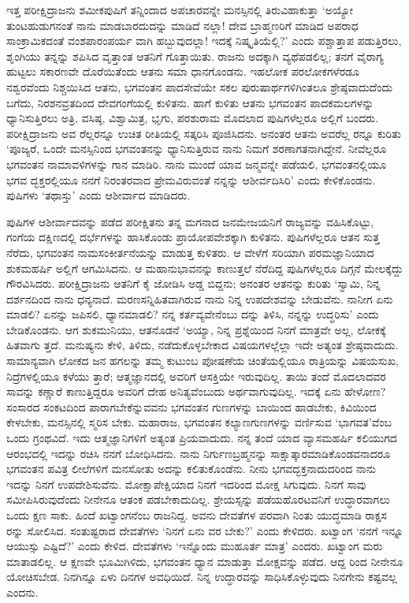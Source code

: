ಇತ್ತ ಪರೀಕ್ಷಿದ್ರಾಜನು ಶಮೀಕಪುಷಿಗೆ ತನ್ನಿಂದಾದ ಅಪಚಾರವನ್ನೇ ಮನಸ್ಸಿನಲ್ಲಿ ತಿರುವಿಹಾಕುತ್ತಾ ‘ಅಯ್ಯೋ ತುಂಟಹುಡುಗನಂತೆ ನಾನು ಮಾಡಬಾರದುದನ್ನು ಮಾಡಿದೆ ನಲ್ಲಾ! ದೇವ ಬ್ರಾಹ್ಮಣರಿಗೆ ಮಾಡಿದ ಅಪರಾಧ ಸಾಂಕ್ರಾಮಿಕದಂತೆ ವಂಶಪಾರಂಪರ್ಯ ವಾಗಿ ಹಬ್ಬುವುದಲ್ಲಾ! ಇದಕ್ಕೆ ನಿಷ್ಕೃತಿಯೆಲ್ಲಿ?’ ಎಂದು ಪಶ್ಚಾತ್ತಾಪ ಪಡುತ್ತಿರಲು, ಶೃಂಗಿಯು ತನ್ನನ್ನು ಶಪಿಸಿದ ವೃತ್ತಾಂತ ಆತನಿಗೆ ಗೊತ್ತಾಯಿತು. ರಾಜನು ಅದಕ್ಕಾಗಿ ವ್ಯಥೆಪಡಲಿಲ್ಲ; ತನಗೆ ವೈರಾಗ್ಯ ಹುಟ್ಟಲು ಸಕಾರಣವೇ ದೊರೆಯಿತೆಂದು ಆತನು ಸಮಾ ಧಾನಗೊಂಡನು. ಇಹಲೋಕ ಪರಲೋಕಗಳೆರಡೂ ನಶ್ವರವೆಂದು ನಿಶ್ಚಯಿಸಿದ ಆತನು, ಭಗವಂತನ ಪಾದಸೇವೆಯೇ ಸಕಲ ಪುರುಷಾರ್ಥಗಳಿಗಿಂತಲೂ ಶ್ರೇಷ್ಠವಾದುದೆಂದು ಬಗೆದು, ನಿರಶನವ್ರತದಿಂದ ದೇವಗಂಗೆಯಲ್ಲಿ ಕುಳಿತನು. ಹಾಗೆ ಕುಳಿತು ಆತನು ಭಗವಂತನ ಪಾದಕಮಲಗಳನ್ನು ಧ್ಯಾನಿಸುತ್ತಿರಲು ಅತ್ರಿ, ವಸಿಷ್ಠ, ವಿಶ್ವಾಮಿತ್ರ, ಭೃಗು, ಪರಶುರಾಮ ಮೊದಲಾದ ಪುಷಿಗಳೆಲ್ಲರೂ ಅಲ್ಲಿಗೆ ಬಂದರು. ಪರೀಕ್ಷಿದ್ರಾಜನು ಅವ ರೆಲ್ಲರನ್ನೂ ಉಚಿತ ರೀತಿಯಲ್ಲಿ ಸತ್ಕರಿಸಿ ಪೂಜಿಸಿದನು. ಅನಂತರ ಆತನು ಅವರೆಲ್ಲ ರನ್ನೂ ಕುರಿತು ‘ಪೂಜ್ಯರೆ, ಒಂದೇ ಮನಸ್ಸಿನಿಂದ ಭಗವಂತನನ್ನು ಧ್ಯಾನಿಸುತ್ತಿರುವ ನಾನು ನಿಮಗೆ ಶರಣಾಗತನಾಗಿದ್ದೇನೆ. ನೀವೆಲ್ಲರೂ ಭಗವಂತನ ನಾಮಾವಳಿಗಳನ್ನು ಗಾನ ಮಾಡಿರಿ. ನಾನು ಮುಂದೆ ಯಾವ ಜನ್ಮವನ್ನೇ ಪಡೆಯಲಿ, ಭಗವಂತನಲ್ಲಿಯೂ ಭಗವ ದ್ಭಕ್ತರಲ್ಲಿಯೂ ನನಗೆ ನಿರಂತರವಾದ ಪ್ರೇಮವಿರುವಂತೆ ನನ್ನನ್ನು ಆಶೀರ್ವದಿಸಿರಿ’ ಎಂದು ಕೇಳಿಕೊಂಡನು. ಪುಷಿಗಳು ‘ತಥಾಸ್ತು’ ಎಂದು ಆಶೀರ್ವಾದ ಮಾಡಿದರು.

ಪುಷಿಗಳ ಆಶೀರ್ವಾದವನ್ನು ಪಡೆದ ಪರೀಕ್ಷಿತನು ತನ್ನ ಮಗನಾದ ಜನಮೇಜಯನಿಗೆ ರಾಜ್ಯವನ್ನು ವಹಿಸಿಕೊಟ್ಟು, ಗಂಗೆಯ ದಕ್ಷಿಣದಲ್ಲಿ ದರ್ಭೆಗಳನ್ನು ಹಾಸಿಕೊಂಡು ಪ್ರಾಯೋಪವೇಶಕ್ಕಾಗಿ ಕುಳಿತನು. ಪುಷಿಗಳೆಲ್ಲರೂ ಆತನ ಸುತ್ತ ನೆರೆದು, ಭಗವಂತನ ನಾಮಸಂಕೀರ್ತನೆಯನ್ನು ಮಾಡುತ್ತ ಕುಳಿತರು. ಆ ವೇಳೆಗೆ ಸರಿಯಾಗಿ ಪರಮಜ್ಞಾನಿಯಾದ ಶುಕಮಹರ್ಷಿ ಅಲ್ಲಿಗೆ ಆಗಮಿಸಿದನು. ಆ ಮಹಾನುಭಾವನನ್ನು ಕಾಣುತ್ತಲೆ ನೆರೆದಿದ್ದ ಪುಷಿಗಳೆಲ್ಲರೂ ದಿಗ್ಗನೆ ಮೇಲಕ್ಕೆದ್ದು ಗೌರವಿಸಿದರು. ಪರೀಕ್ಷಿದ್ರಾಜನು ಆತನಿಗೆ ಕೈ ಜೋಡಿಸಿ ಅಡ್ಡ ಬಿದ್ದನು; ಅನಂತರ ಆತನನ್ನು ಕುರಿತು ‘ಸ್ವಾಮಿ, ನಿನ್ನ ದರ್ಶನದಿಂದ ನಾನು ಧನ್ಯನಾದೆ. ಮರಣಸನ್ನಿಹಿತವಾಗಿರುವ ನಾನು ನಿನ್ನ ಉಪದೇಶವನ್ನು ಬೇಡುವೆನು. ನಾನೀಗ ಏನು ಮಾಡಲಿ? ಏನನ್ನು ಜಪಿಸಲಿ, ಧ್ಯಾನಮಾಡಲಿ? ನನ್ನ ಕರ್ತವ್ಯವೇನೆಂಬು ದನ್ನು ತಿಳಿಸಿ, ನನ್ನನ್ನು ಉದ್ಧರಿಸು’ ಎಂದು ಬೇಡಿಕೊಂಡನು. ಆಗ ಶುಕಮುನಿಯು, ಆತನೊಡನೆ ‘ಅಯ್ಯಾ, ನಿನ್ನ ಪ್ರಶ್ನೆಯಿಂದ ನಿನಗೆ ಮಾತ್ರವೇ ಅಲ್ಲ, ಲೋಕಕ್ಕೆ ಹಿತವಾಗು ತ್ತದೆ. ಮನುಷ್ಯನು ಕೇಳಿ, ತಿಳಿದು, ನಡೆದುಕೊಳ್ಳಬೇಕಾದ ವಿಷಯಗಳಲ್ಲೆಲ್ಲಾ ಇದೇ ಅತ್ಯಂತ ಶ್ರೇಷ್ಠವಾದುದು. ಸಾಮಾನ್ಯವಾಗಿ ಲೋಕದ ಜನ ಹಗಲನ್ನು ತಮ್ಮ ಕುಟುಂಬ ಪೋಷಣೆಯ ಚಿಂತೆಯಲ್ಲಿಯೂ ರಾತ್ರಿಯನ್ನು ವಿಷಯಸುಖ, ನಿದ್ರೆಗಳಲ್ಲಿಯೂ ಕಳೆಯು ತ್ತಾರೆ; ಆತ್ಮಜ್ಞಾನದಲ್ಲಿ ಅವರಿಗೆ ಆಸಕ್ತಿಯೇ ಇರುವುದಿಲ್ಲ. ತಾಯಿ ತಂದೆ ಮೊದಲಾದವರ ಸಾವನ್ನು ಕಣ್ಣಾರೆ ಕಾಣುತ್ತಿದ್ದರೂ ಅವರಿಗೆ ದೇಹ ಅನಿತ್ಯವೆಂಬುದು ಅರ್ಥವಾಗುವುದಿಲ್ಲ. ಇದಕ್ಕೆ ಏನು ಹೇಳೋಣ? ಸಂಸಾರದ ಸಂಕಟದಿಂದ ಪಾರಾಗಬೇಕೆನ್ನುವವನು ಭಗವಂತನ ಗುಣಗಳನ್ನು ಬಾಯಿಂದ ಹಾಡಬೇಕು, ಕಿವಿಯಿಂದ ಕೇಳಬೇಕು, ಮನಸ್ಸಿನಲ್ಲಿ ಸ್ಮರಿಸ ಬೇಕು. ಮಹಾರಾಜ, ಭಗವಂತನ ಕಲ್ಯಾಣಗುಣಗಳನ್ನು ವರ್ಣಿಸುವ ‘ಭಾಗವತ’ವೆಂಬ ಒಂದು ಗ್ರಂಥವಿದೆ. ಇದು ಆತ್ಮಜ್ಞಾನಿಗಳಿಗೆ ಅತ್ಯಂತ ಪ್ರಿಯವಾದುದು. ನನ್ನ ತಂದೆ ಯಾದ ವ್ಯಾಸಮಹರ್ಷಿ ಕಲಿಯುಗದ ಆರಂಭದಲ್ಲಿ ಇದನ್ನು ರಚಿಸಿ ನನಗೆ ಬೋಧಿಸಿದನು. ನಾನು ನಿರ್ಗುಣಬ್ರಹ್ಮನನ್ನು ಸಾಕ್ಷಾತ್ಕಾರಮಾಡಿಕೊಂಡವನಾದರೂ ಭಗವಂತನ ಪವಿತ್ರ ಲೀಲೆಗಳಿಗೆ ಮನಸೋತು ಅದನ್ನು ಕಲಿತುಕೊಂಡೆನು. ನೀನು ಭಗವದ್ಭಕ್ತನಾದುದರಿಂದ ನಾನು ಇದನ್ನು ನಿನಗೆ ಉಪದೇಶಿಸುವೆನು. ಮೋಕ್ಷಾಪೇಕ್ಷಿಯಾದ ನಿನಗೆ ಇದರಿಂದ ಮೋಕ್ಷ ಸಿಗುವುದು. ನಿನಗೆ ಸಾವು ಸಮೀಪಿಸಿರುವುದೆಂದು ನೀನೇನೂ ಆತಂಕ ಪಡಬೇಕಾದುದಿಲ್ಲ. ಶ್ರೇಯಸ್ಸನ್ನು ಪಡೆಯಹೊರಟವನಿಗೆ ಉದ್ಧಾರವಾಗಲು ಒಂದು ಕ್ಷಣ ಸಾಕು. ಹಿಂದೆ ಖಟ್ವಾಂಗನೆಂಬ ರಾಜನಿದ್ದ. ಅವನು ದೇವತೆಗಳ ಪರವಾಗಿ ನಿಂತು ಯುದ್ಧಮಾಡಿ ರಾಕ್ಷಸ ರನ್ನು ಸೋಲಿಸಿದ. ಸಂತುಷ್ಟರಾದ ದೇವತೆಗಳು ‘ನಿನಗೆ ಏನು ವರ ಬೇಕು?’ ಎಂದು ಕೇಳಿದರು. ಖಟ್ವಾಂಗ ‘ನನಗೆ ಇನ್ನೂ ಆಯುಸ್ಸು ಎಷ್ಟಿದೆ?’ ಎಂದು ಕೇಳಿದ. ದೇವತೆಗಳು ‘ಇನ್ನೊಂದು ಮುಹೂರ್ತ ಮಾತ್ರ’ ಎಂದರು. ಖಟ್ವಾಂಗ ಮರು ಮಾತಾಡಲಿಲ್ಲ. ಆ ಕ್ಷಣವೇ ಭೂಮಿಗಿಳಿದು, ಭಗವಂತನ ಧ್ಯಾನ ಮಾಡುತ್ತಾ ಮೋಕ್ಷವನ್ನು ಪಡೆದ. ಆದ್ದ ರಿಂದ ನೀನೇನೂ ಯೋಚಿಸಬೇಡ. ನಿನಗಿನ್ನೂ ಏಳು ದಿನಗಳ ಅವಧಿಯಿದೆ. ನಿನ್ನ ಉದ್ಧಾರವನ್ನು ಸಾಧಿಸಿಕೊಳ್ಳುವುದು ನಿನಗೇನು ಕಷ್ಟವಲ್ಲ ಎಂದನು.

